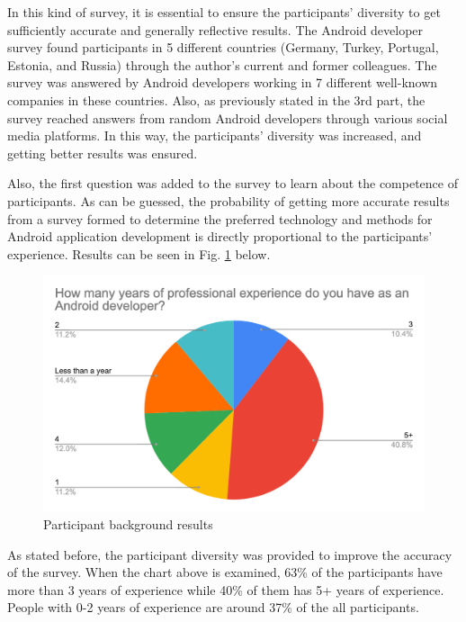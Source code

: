 In this kind of survey, it is essential to ensure the participants’ diversity to get sufficiently accurate and generally reflective results. The Android developer survey found participants in 5 different countries (Germany, Turkey, Portugal, Estonia, and Russia) through the author's current and former colleagues. The survey was answered by Android developers working in 7 different well-known companies in these countries. Also, as previously stated in the 3rd part, the survey reached answers from random Android developers through various social media platforms. In this way, the participants’ diversity was increased, and getting better results was ensured. 

Also, the first question was added to the survey to learn about the competence of participants. As can be guessed, the probability of getting more accurate results from a survey formed to determine the preferred technology and methods for Android application development is directly proportional to the participants’ experience. Results can be seen in Fig. \ref{fig:participant_bg} below.
\begin{figure}[ht!]
    \centering
    \includegraphics[scale=0.25]{figures/survey_q1_dev_experience.png}
    \caption{Participant background results}
    \label{fig:participant_bg}
\end{figure}
\FloatBarrier

As stated before, the participant diversity was provided to improve the accuracy of the survey. When the chart above is examined, 63\% of the participants have more than 3 years of experience while 40\% of them has 5+ years of experience. People with 0-2 years of experience are around 37\% of the all participants.